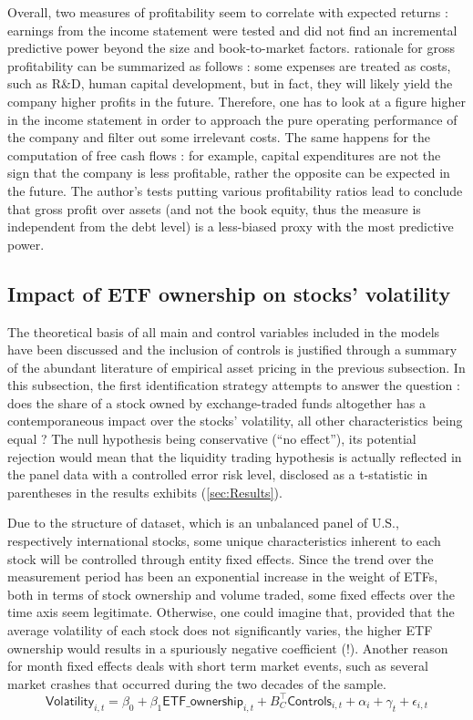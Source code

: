Overall, two measures of profitability seem to correlate with expected returns : earnings from the income statement were tested and \textcite{Fama2006} did not find an incremental predictive power beyond the size and book-to-market factors. \textcite{Novy-Marx2013} rationale for gross profitability can be summarized as follows : some expenses are treated as costs, such as R\&D, human capital development, but in fact, they will likely yield the company higher profits in the future. Therefore, one has to look at a figure higher in the income statement in order to approach the pure operating performance of the company and filter out some irrelevant costs. The same happens for the computation of free cash flows : for example, capital expenditures are not the sign that the company is less profitable, rather the opposite can be expected in the future. The author's tests putting various profitability ratios lead to conclude that gross profit over assets (and not the book equity, thus the measure is independent from the debt level) is a less-biased proxy with the most predictive power.
\subsection{Impact of ETF ownership on stocks' volatility}
\label{subsec:Method:Volatility}
The theoretical basis of all main and control variables included in the models have been discussed and the inclusion of controls is justified through a summary of the abundant literature of empirical asset pricing in the previous subsection. In this subsection, the first identification strategy attempts to answer the question : does the share of a stock owned by exchange-traded funds altogether has a contemporaneous impact over the stocks' volatility, all other characteristics being equal ? The null hypothesis being conservative (``no effect''), its potential rejection would mean that the liquidity trading hypothesis is actually reflected in the panel data with a controlled error risk level, disclosed as a t-statistic in parentheses in the results exhibits (\autoref{sec:Results}).

Due to the structure of dataset, which is an unbalanced panel of U.S., respectively international stocks, some unique characteristics inherent to each stock will be controlled through entity fixed effects. Since the trend over the measurement period has been an exponential increase in the weight of ETFs, both in terms of stock ownership and volume traded, some fixed effects over the time axis seem legitimate. Otherwise, one could imagine that, provided that the average volatility of each stock does not significantly varies, the higher ETF ownership would results in a spuriously negative coefficient (!). Another reason for month fixed effects deals with short term market events, such as several market crashes that occurred during the two decades of the sample. 
\begin{equation}
  \mathsf{Volatility}_{i,t} = \beta_{0} + \beta_{1} \mathsf{ETF\_ownership}_{i, t} + B_{C}^{\intercal} \mathsf{Controls}_{i, t} + \alpha_{i} + \gamma_{t} + \epsilon_{i, t}
\end{equation}

